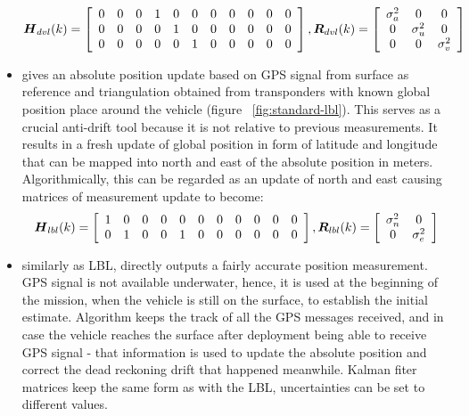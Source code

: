 \begin{itemize}
\begin{equation}
\label{eq:dvl-mes}
\boldsymbol{H}_{dvl}(k) = 
\left[ \begin{array}{ccccccccccc}
0 & 0 & 0 & 1 & 0 & 0 & 0 & 0 & 0 & 0 & 0 \\
0 & 0 & 0 & 0 & 1 & 0 & 0 & 0 & 0 & 0 & 0 \\
0 & 0 & 0 & 0 & 0 & 1 & 0 & 0 & 0 & 0 & 0 \end{array} \right], 
\boldsymbol{R}_{dvl}(k) =
\left[ \begin{array}{ccc}
\sigma_{a}^{2} & 0 & 0 \\
0 & \sigma_{u}^{2} & 0 \\
0 &     0          & \sigma_{v}^{2} \end{array} \right]
\end{equation}
\item {}
gives an absolute position update based on GPS signal from surface as reference and triangulation obtained from transponders with known global position place around the vehicle (figure ~\ref{fig:standard-lbl}). This serves as a crucial anti-drift tool because it is not relative to previous measurements. It results in a fresh update of global position in form of latitude and longitude that can be mapped into north and east of the absolute position in meters. Algorithmically, this can be regarded as an update of north and east causing matrices of measurement update to become:
\begin{equation}
\label{eq:lbl-mes}
\boldsymbol{H}_{lbl}(k) = 
\left[ \begin{array}{ccccccccccc}
1 & 0 & 0 & 0 & 0 & 0 & 0 & 0 & 0 & 0 & 0 \\
0 & 1 & 0 & 0 & 1 & 0 & 0 & 0 & 0 & 0 & 0 \end{array} \right], 
\boldsymbol{R}_{lbl}(k) =
\left[ \begin{array}{cc}
\sigma_{n}^{2} & 0  \\
0 & \sigma_{e}^{2}  \end{array} \right]
\end{equation}
\item {}
similarly as LBL, directly outputs a fairly accurate position measurement. GPS signal is not available underwater, hence, it is used at the beginning of the mission, when the vehicle is still on the surface, to establish the initial estimate. Algorithm keeps the track of all the GPS messages received, and in case the vehicle reaches the surface after deployment being able to receive GPS signal - that information is used to update the absolute position and correct the dead reckoning drift that happened meanwhile. Kalman fiter matrices keep the same form as with the LBL, uncertainties can be set to different values.
\end{itemize}

